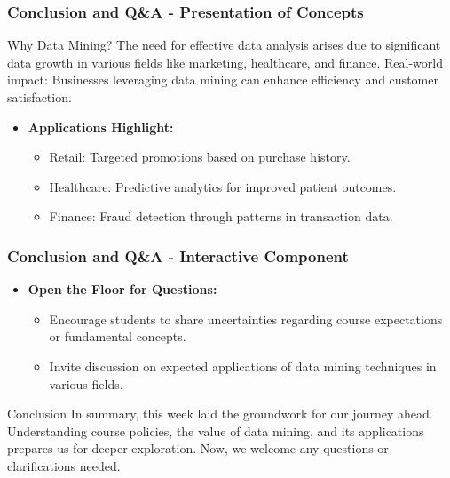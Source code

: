 \documentclass[aspectratio=169]{beamer}
\begin{document}
\begin{frame}[fragile]
    \frametitle{Conclusion and Q\&A - Presentation of Concepts}
    \begin{block}{Why Data Mining?}
        The need for effective data analysis arises due to significant data growth in various fields like marketing, healthcare, and finance.
        Real-world impact: Businesses leveraging data mining can enhance efficiency and customer satisfaction.
    \end{block}

    \begin{itemize}
        \item \textbf{Applications Highlight:}
        \begin{itemize}
            \item Retail: Targeted promotions based on purchase history.
            \item Healthcare: Predictive analytics for improved patient outcomes.
            \item Finance: Fraud detection through patterns in transaction data.
        \end{itemize}
    \end{itemize}
\end{frame}

\begin{frame}[fragile]
    \frametitle{Conclusion and Q\&A - Interactive Component}
    \begin{itemize}
        \item \textbf{Open the Floor for Questions:}
        \begin{itemize}
            \item Encourage students to share uncertainties regarding course expectations or fundamental concepts.
            \item Invite discussion on expected applications of data mining techniques in various fields.
        \end{itemize}
    \end{itemize}

    \begin{block}{Conclusion}
        In summary, this week laid the groundwork for our journey ahead. 
        Understanding course policies, the value of data mining, and its applications prepares us for deeper exploration.
        Now, we welcome any questions or clarifications needed.
    \end{block}
\end{frame}
\end{document}

